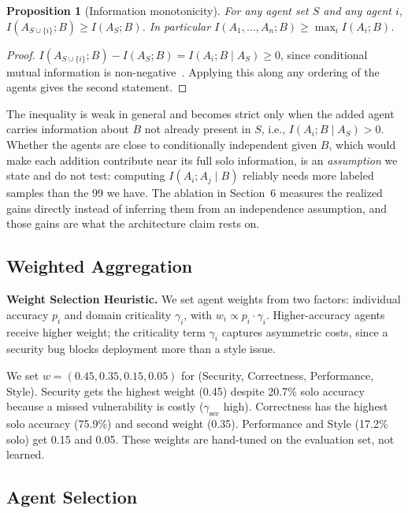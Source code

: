 \documentclass[10pt,twocolumn]{article}
\newtheorem{proposition}[theorem]{Proposition}
\begin{document}
\begin{proposition}[Information monotonicity]
\label{prop:monotone}
For any agent set $S$ and any agent $i$, $I(A_{S \cup \{i\}}; B) \geq I(A_S; B)$. In particular $I(A_1, \ldots, A_n; B) \geq \max_i I(A_i; B)$.
\end{proposition}

\begin{proof}
$I(A_{S \cup \{i\}}; B) - I(A_S; B) = I(A_i; B \mid A_S) \geq 0$, since conditional mutual information is non-negative~\cite{cover2006information}. Applying this along any ordering of the agents gives the second statement.
\end{proof}

The inequality is weak in general and becomes strict only when the added agent carries information about $B$ not already present in $S$, i.e., $I(A_i; B \mid A_S) > 0$. Whether the agents are close to conditionally independent given $B$, which would make each addition contribute near its full solo information, is an \emph{assumption} we state and do not test: computing $I(A_i; A_j \mid B)$ reliably needs more labeled samples than the 99 we have. The ablation in Section~6 measures the realized gains directly instead of inferring them from an independence assumption, and those gains are what the architecture claim rests on.

\subsection{Weighted Aggregation}

\textbf{Weight Selection Heuristic.} We set agent weights from two factors: individual accuracy $p_i$ and domain criticality $\gamma_i$, with $w_i \propto p_i \cdot \gamma_i$. Higher-accuracy agents receive higher weight; the criticality term $\gamma_i$ captures asymmetric costs, since a security bug blocks deployment more than a style issue.

We set $w = (0.45, 0.35, 0.15, 0.05)$ for (Security, Correctness, Performance, Style). Security gets the highest weight (0.45) despite 20.7\% solo accuracy because a missed vulnerability is costly ($\gamma_{\text{sec}}$ high). Correctness has the highest solo accuracy (75.9\%) and second weight (0.35). Performance and Style (17.2\% solo) get 0.15 and 0.05. These weights are hand-tuned on the evaluation set, not learned.

\subsection{Agent Selection}
\end{document}
